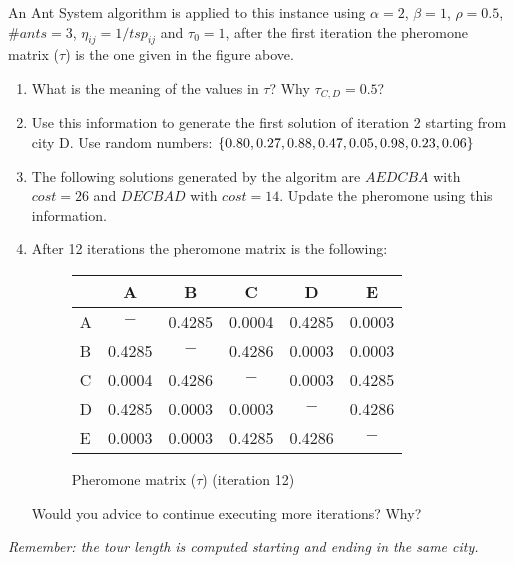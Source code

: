 \documentclass[11pt,a4paper]{article}
\theoremstyle{definition}%
\begin{document}
\begin{enumerate}
   An Ant System algorithm is applied to this instance using $\alpha=2$, $\beta=1$, $\rho=0.5$, $\#ants=3$, $\eta_{ij}=1/tsp_{ij}$ and $\tau_0=1$, after the first iteration the pheromone matrix ($\tau$) is the one given in the figure above. 
   \begin{enumerate}
     \item What is the meaning of the values in $\tau$? Why $\tau_{C,D}=0.5$?
     \item Use this information to generate the first solution of 
     iteration 2 starting from city D. Use random numbers: $\{0.80, 
     0.27, 0.88, 0.47, 0.05, \\0.98, 0.23, 0.06 \}$
     \item The following solutions generated by the algoritm  are $AEDCBA$ with $cost=26$ and $DECBAD$ with $cost=14$. Update the pheromone using this information.
     \item After 12 iterations the pheromone matrix is the following:
        \begin{figure}[ht]
           \centering
           \begin{tabular} {| l | c |c | c | c | c |}
            \hline
                &  A  &  B  &  C  &  D  & E   \\
            \hline
              A & $-$     &  0.4285  &  0.0004  &  0.4285  & 0.0003   \\
              B &  0.4285 & $-$      &  0.4286  &  0.0003  & 0.0003  \\  
              C &  0.0004 &  0.4286  & $-$      &  0.0003  & 0.4285   \\
              D &  0.4285 &  0.0003  &  0.0003  & $-$      & 0.4286   \\
              E &  0.0003 &  0.0003  &  0.4285  &  0.4286  & $-$  \\
            \hline
            \end{tabular}
            \caption{Pheromone matrix ($\tau$) (iteration 12)}
        \end{figure}
         
         Would you advice to continue executing more iterations? Why?
   \end{enumerate}
 \textit{Remember: the tour length is computed starting and ending in the same city.}
  
 \end{enumerate}
\end{document}
